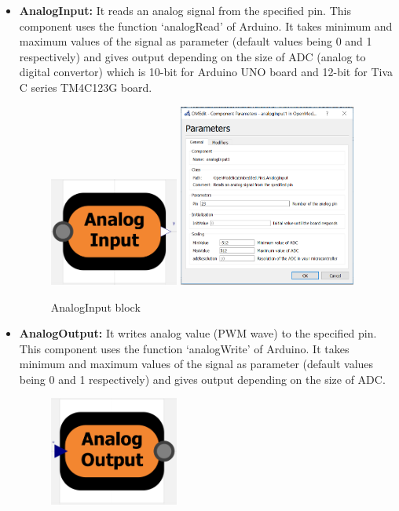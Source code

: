 \documentclass[12pt,a4paper]{report}
\begin{document}
\begin{itemize}
\item \textbf{AnalogInput:} It reads an analog signal from the specified pin. This component uses the function ‘analogRead’ of Arduino. It takes minimum and maximum values of the signal as parameter (default values being 0 and 1 respectively) and gives output depending on the size of ADC (analog to digital convertor) which is 10-bit for Arduino UNO board and 12-bit for Tiva C series TM4C123G board.
\begin{figure}[H]
\centering
\includegraphics[width = 0.4\textwidth]{pin11}
\includegraphics[width = 0.55\textwidth]{pin12}
\caption{AnalogInput block}
\label{figure:3}
\end{figure}
\item \textbf{AnalogOutput:} It writes analog value (PWM wave) to the specified pin. This component uses the function ‘analogWrite’ of Arduino. It takes minimum and maximum values of the signal as parameter (default values being 0 and 1 respectively) and gives output depending on the size of ADC.
\begin{figure}[H]
\centering
\includegraphics[width = 0.4\textwidth]{pin21}

\end{figure}
\end{itemize}
\end{document}
